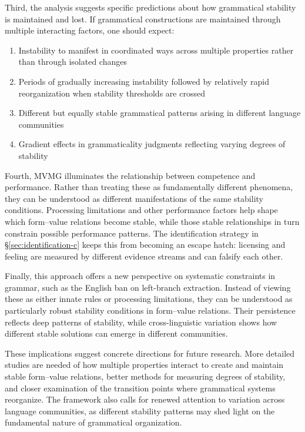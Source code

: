 \documentclass[12pt,letterpaper]{article}
\begin{document}
Third, the analysis suggests specific predictions about how grammatical stability is maintained and lost. If grammatical constructions are maintained through multiple interacting factors, one should expect:
\begin{enumerate}
    \item Instability to manifest in coordinated ways across multiple properties rather than through isolated changes
    \item Periods of gradually increasing instability followed by relatively rapid reorganization when stability thresholds are crossed
    \item Different but equally stable grammatical patterns arising in different language communities
    \item Gradient effects in grammaticality judgments reflecting varying degrees of stability
\end{enumerate}

Fourth, MVMG illuminates the relationship between competence and performance. Rather than treating these as fundamentally different phenomena, they can be understood as different manifestations of the same stability conditions. Processing limitations and other performance factors help shape which form--value relations become stable, while those stable relationships in turn constrain possible performance patterns. The identification strategy in \S\ref{sec:identification-c} keeps this from becoming an escape hatch: licensing and feeling are measured by different evidence streams and can falsify each other.

Finally, this approach offers a new perspective on systematic constraints in grammar, such as the English ban on left-branch extraction. Instead of viewing these as either innate rules or processing limitations, they can be understood as particularly robust stability conditions in form--value relations. Their persistence reflects deep patterns of stability, while cross-linguistic variation shows how different stable solutions can emerge in different communities.

These implications suggest concrete directions for future research. More detailed studies are needed of how multiple properties interact to create and maintain stable form--value relations, better methods for measuring degrees of stability, and closer examination of the transition points where grammatical systems reorganize. The framework also calls for renewed attention to variation across language communities, as different stability patterns may shed light on the fundamental nature of grammatical organization.
\end{document}
